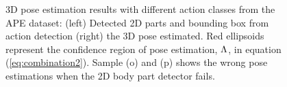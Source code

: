 \begin{figure}[*th]
\begin{center}
{\begin{tabular}{@{}c@{}c@{}c@{}c@{}c@{}c@{}c@{}c@{}}
\end{tabular}
\caption{3D pose estimation results with different action classes from the APE dataset: (left) Detected 2D parts and bounding box from action detection (right) the 3D pose estimated.  Red ellipsoids represent the confidence region of pose estimation, $\Lambda$, in equation (\ref{eq:combination2}). Sample (o) and (p) shows the wrong pose estimations when the 2D body part detector fails.}
\label{fig:aperesults}
} 
\end{center} 
\end{figure} 
